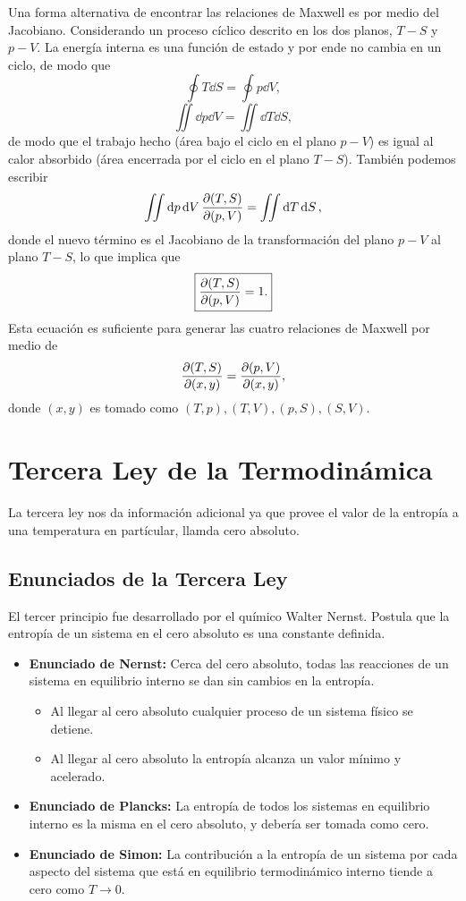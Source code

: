 Una forma alternativa de encontrar las relaciones de Maxwell es por medio del Jacobiano. Considerando un proceso cíclico descrito en los dos planos, $T-S$ y $p-V$. La energía interna es una función de estado y por ende no cambia en un ciclo, de modo que
	$$ \oint T\dd{S} = \oint p\dd{V}, $$
	$$ \iint \dd{p} \dd{V} = \iint \dd{T} \dd{S}, $$
de modo que el trabajo hecho (área bajo el ciclo en el plano $p-V$) es igual al calor absorbido (área encerrada por el ciclo en el plano $T-S$). También podemos escribir
	$$ \iint \dd{p} \dd{V} \pdv{(T,S)}{(p,V)} = \iint \dd{T} \dd{S}, $$
donde el nuevo término es el Jacobiano de la transformación del plano $p-V$ al plano $T-S$, lo que implica que
	$$ \boxed{ \pdv{(T,S)}{(p,V)} = 1. } $$
Esta ecuación es suficiente para generar las cuatro relaciones de Maxwell por medio de
	$$ \pdv{(T,S)}{(x,y)} = \pdv{(p,V)}{(x,y)}, $$
donde $(x,y)$ es tomado como $(T,p), (T,V), (p,S), (S,V)$.



\chapter{Tercera Ley de la Termodinámica}
La tercera ley nos da información adicional ya que provee el valor de la entropía a una temperatura en partícular, llamda cero absoluto.

\section{Enunciados de la Tercera Ley}
El tercer principio fue desarrollado por el químico Walter Nernst. Postula que la entropía de un sistema en el cero absoluto es una constante definida.

\begin{itemize}
	\item \textbf{Enunciado de Nernst: } Cerca del cero absoluto, todas las reacciones de un sistema en equilibrio interno se dan sin cambios en la entropía.
	\begin{itemize}
		\item Al llegar al cero absoluto cualquier proceso de un sistema físico se detiene.
		\item Al llegar al cero absoluto la entropía alcanza un valor mínimo y acelerado.
	\end{itemize}
	\item \textbf{Enunciado de Plancks: } La entropía de todos los sistemas en equilibrio interno es la misma en el cero absoluto, y debería ser tomada como cero.
	\item \textbf{Enunciado de Simon: } La contribución a la entropía de un sistema por cada aspecto del sistema que está en equilibrio termodinámico interno tiende a cero como $T\to 0$.
\end{itemize}

